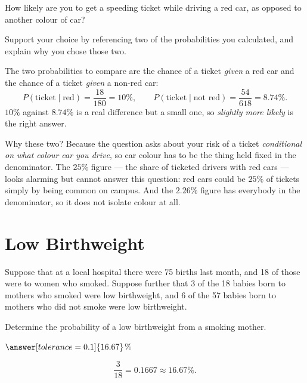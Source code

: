 \documentclass[12pt]{ximera}
\begin{document}
\begin{problem}
How likely are you to get a speeding ticket while driving a red car, as opposed to
another colour of car?

\begin{multipleChoice}
\end{multipleChoice}

Support your choice by referencing two of the probabilities you calculated, and explain
why you chose those two.

\begin{freeResponse}
\end{freeResponse}

\begin{solution}
The two probabilities to compare are the chance of a ticket \emph{given} a red car and
the chance of a ticket \emph{given} a non-red car:
\[
P(\text{ticket} \mid \text{red}) = \frac{18}{180} = 10\%,
\qquad
P(\text{ticket} \mid \text{not red}) = \frac{54}{618} = 8.74\%.
\]
$10\%$ against $8.74\%$ is a real difference but a small one, so \emph{slightly more
likely} is the right answer.

Why these two? Because the question asks about your risk of a ticket \emph{conditional on
what colour car you drive}, so car colour has to be the thing held fixed in the
denominator. The $25\%$ figure --- the share of ticketed drivers with red cars --- looks
alarming but cannot answer this question: red cars could be $25\%$ of tickets simply by
being common on campus. And the $2.26\%$ figure has everybody in the denominator, so it
does not isolate colour at all.
\end{solution}
\end{problem}

\section*{Low Birthweight}

Suppose that at a local hospital there were 75 births last month, and 18 of those were to
women who smoked. Suppose further that 3 of the 18 babies born to mothers who smoked were
low birthweight, and 6 of the 57 babies born to mothers who did not smoke were low
birthweight.

\begin{problem}
Determine the probability of a low birthweight from a smoking mother.

$\answer[tolerance=0.1]{16.67}$\%

\begin{solution}
\[
\frac{3}{18} = 0.1667 \approx 16.67\%.
\]
\end{solution}
\end{problem}
\end{document}
